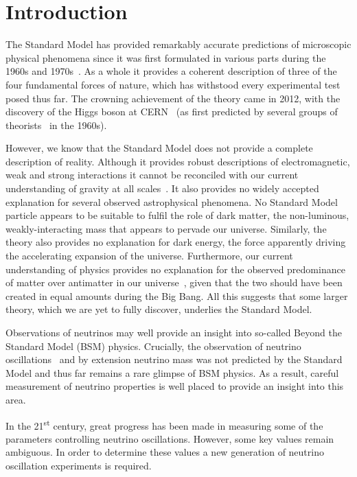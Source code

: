 \chapter{Introduction}
\label{sec:intro}

The Standard Model has provided remarkably accurate predictions of microscopic physical phenomena since it was first formulated in various parts during the 1960s and 1970s~\cite{glashow1961, weinberg1967, qcdTheory1, qcdTheory2}.
As a whole it provides a coherent description of three of the four fundamental forces of nature, which has withstood every experimental test posed thus far. 
The crowning achievement of the theory came in 2012, with the discovery of the Higgs boson at CERN~\cite{higgsDiscoveryATLAS, higgsDiscoveryCMS} (as first predicted by several groups of theorists~\cite{higgsTheory1, higgsTheory2, higgsTheory3} in the 1960s).

However, we know that the Standard Model does not provide a complete description of reality.
Although it provides robust descriptions of electromagnetic, weak and strong interactions it cannot be reconciled with our current understanding of gravity at all scales~\cite{quantumGravity}.
It also provides no widely accepted explanation for several observed astrophysical phenomena.
No Standard Model particle appears to be suitable to fulfil the role of dark matter, the non-luminous, weakly-interacting mass that appears to pervade our universe.
Similarly, the theory also provides no explanation for dark energy, the force apparently driving the accelerating expansion of the universe.
Furthermore, our current understanding of physics provides no explanation for the observed predominance of matter over antimatter in our universe~\cite{matterAntimatterAMS}, given that the two should have been created in equal amounts during the Big Bang.
All this suggests that some larger theory, which we are yet to fully discover, underlies the Standard Model.

Observations of neutrinos may well provide an insight into so-called Beyond the Standard Model (BSM) physics.
Crucially, the observation of neutrino oscillations~\cite{SNO, superK} and by extension neutrino mass was not predicted by the Standard Model and thus far remains a rare glimpse of BSM physics.
As a result, careful measurement of neutrino properties is well placed to provide an insight into this area.

In the 21\textsuperscript{st} century, great progress has been made in measuring some of the parameters controlling neutrino oscillations.
However, some key values remain ambiguous.
In order to determine these values a new generation of neutrino oscillation experiments is required.

